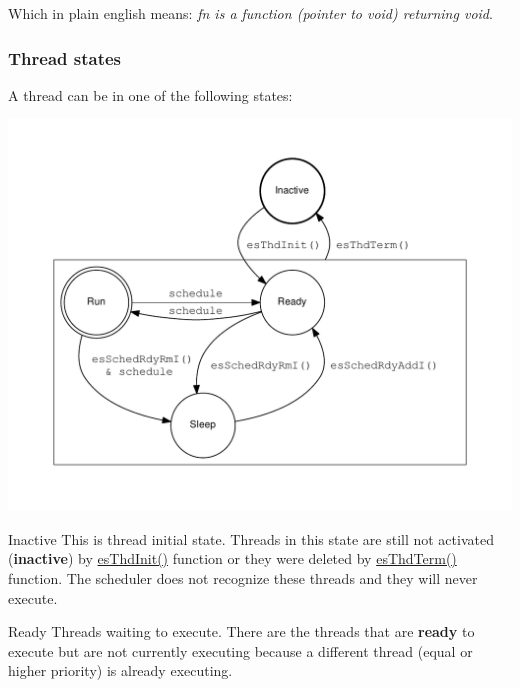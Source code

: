 Which in plain english means\-: {\itshape fn is a function (pointer to void) returning void}.\hypertarget{threads_kern_threads_state}{}\subsubsection{Thread states}\label{threads_kern_threads_state}
A thread can be in one of the following states\-: \begin{center}

\begin{DoxyImageNoCaption}
  \mbox{\includegraphics[width=\textwidth,height=\textheight/2,keepaspectratio=true]{dot_inline_dotgraph_2}}
\end{DoxyImageNoCaption}
\end{center}
 \begin{DoxyParagraph}{Inactive}
This is thread initial state. Threads in this state are still not activated ({\bfseries inactive}) by \hyperlink{group__kern__thd_gac91734f3ee867b519f59bf81cc7fde88}{es\-Thd\-Init()} function or they were deleted by \hyperlink{group__kern__thd_gac9d1eac76f26096614e8196bcfd8b905}{es\-Thd\-Term()} function. The scheduler does not recognize these threads and they will never execute.
\end{DoxyParagraph}
\begin{DoxyParagraph}{Ready}
Threads waiting to execute. There are the threads that are {\bfseries ready} to execute but are not currently executing because a different thread (equal or higher priority) is already executing.
\end{DoxyParagraph}
